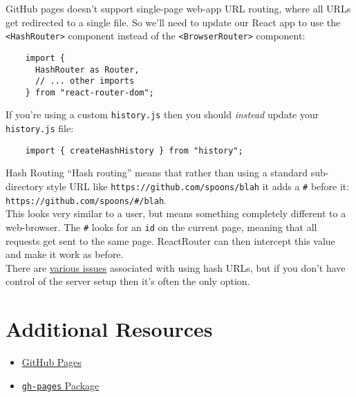 GitHub pages doesn't support single-page web-app URL routing, where all URLs get redirected to a single file. So we'll need to update our React app to use the \texttt{<HashRouter>} component instead of the \texttt{<BrowserRouter>} component:

\begin{verbatim}
    import {
      HashRouter as Router,
      // ... other imports
    } from "react-router-dom";
\end{verbatim}

If you're using a custom \texttt{history.js} then you should \textit{instead} update your \texttt{history.js} file:

\begin{verbatim}
    import { createHashHistory } from "history";
\end{verbatim}

\pagebreak


\begin{infobox}{Hash Routing}
    ``Hash routing'' means that rather than using a standard sub-directory style URL like \texttt{https://github.com/spoons/blah} it adds a \texttt{\#} before it: \\ \texttt{https://github.com/spoons/\#/blah}.
    \\

    This looks very similar to a user, but means something completely different to a web-browser. The \texttt{\#} looks for an \texttt{id} on the current page, meaning that all requests get sent to the same page. ReactRouter can then intercept this value and make it work as before.
    \\

    There are \href{https://www.quora.com/Are-hashbang-URLs-a-recommended-practice}{various issues} associated with using hash URLs, but if you don't have control of the server setup then it's often the only option.
\end{infobox}


\section{Additional Resources}

\begin{itemize}[leftmargin=*]
    \item \href{https://pages.github.com}{GitHub Pages}
    \item \href{https://github.com/tschaub/gh-pages}{\texttt{gh-pages} Package}
\end{itemize}

